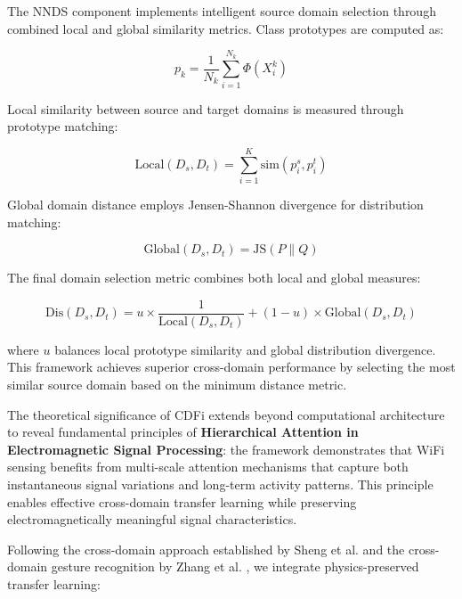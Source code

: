 \documentclass[journal]{IEEEtran}
\begin{document}
The NNDS component implements intelligent source domain selection through combined local and global similarity metrics. Class prototypes are computed as:

\begin{equation}
p_k = \frac{1}{N_k} \sum_{i=1}^{N_k} \Phi(X_i^k)
\label{eq:cdfi_prototype}
\end{equation}

Local similarity between source and target domains is measured through prototype matching:

\begin{equation}
\text{Local}(D_s, D_t) = \sum_{i=1}^{K} \text{sim}(p_i^s, p_i^t)
\label{eq:cdfi_local_similarity}
\end{equation}

Global domain distance employs Jensen-Shannon divergence for distribution matching:

\begin{equation}
\text{Global}(D_s, D_t) = \text{JS}(P \| Q)
\label{eq:cdfi_global_distance}
\end{equation}

The final domain selection metric combines both local and global measures:

\begin{equation}
\text{Dis}(D_s, D_t) = u \times \frac{1}{\text{Local}(D_s, D_t)} + (1-u) \times \text{Global}(D_s, D_t)
\label{eq:cdfi_domain_distance}
\end{equation}

where $u$ balances local prototype similarity and global distribution divergence. This framework achieves superior cross-domain performance by selecting the most similar source domain based on the minimum distance metric.

The theoretical significance of CDFi extends beyond computational architecture to reveal fundamental principles of \textbf{Hierarchical Attention in Electromagnetic Signal Processing}: the framework demonstrates that WiFi sensing benefits from multi-scale attention mechanisms that capture both instantaneous signal variations and long-term activity patterns. This principle enables effective cross-domain transfer learning while preserving electromagnetically meaningful signal characteristics.

Following the cross-domain approach established by Sheng et al. \cite{sheng2024cdfi} and the cross-domain gesture recognition by Zhang et al. \cite{zhang2021wifi}, we integrate physics-preserved transfer learning:
\end{document}
